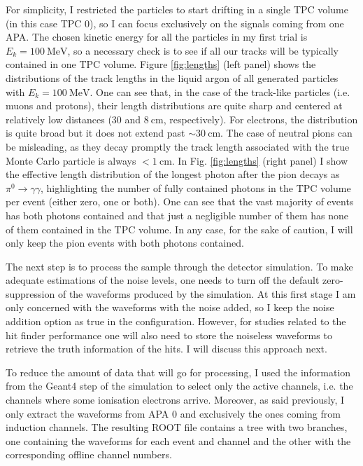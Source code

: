 For simplicity, I restricted the particles to start drifting in a single TPC volume (in this case TPC 0), so I can focus exclusively on the signals coming from one APA. The chosen kinetic energy for all the particles in my first trial is $E_{k} = 100 \ \mathrm{MeV}$, so a necessary check is to see if all our tracks will be typically contained in one TPC volume. Figure \ref{fig:lengths} (left panel) shows the distributions of the track lengths in the liquid argon of all generated particles with $E_{k} = 100 \ \mathrm{MeV}$. One can see that, in the case of the track-like particles (i.e. muons and protons), their length distributions are quite sharp and centered at relatively low distances ($30$ and $8 \ \mathrm{cm}$, respectively). For electrons, the distribution is quite broad but it does not extend past $\sim 30 \ \mathrm{cm}$. The case of neutral pions can be misleading, as they decay promptly the track length associated with the true Monte Carlo particle is always $< 1 \ \mathrm{cm}$. In Fig. \ref{fig:lengths} (right panel) I show the effective length distribution of the longest photon after the pion decays as $\pi^{0} \rightarrow \gamma \gamma$, highlighting the number of fully contained photons in the TPC volume per event (either zero, one or both). One can see that the vast majority of events has both photons contained and that just a negligible number of them has none of them contained in the TPC volume. In any case, for the sake of caution, I will only keep the pion events with both photons contained.

The next step is to process the sample through the detector simulation. To make adequate estimations of the noise levels, one needs to turn off the default zero-suppression of the waveforms produced by the simulation. At this first stage I am only concerned with the waveforms with the noise added, so I keep the noise addition option as true in the configuration. However, for studies related to the hit finder performance one will also need to store the noiseless waveforms to retrieve the truth information of the hits. I will discuss this approach next.

To reduce the amount of data that will go for processing, I used the information from the Geant4 step of the simulation to select only the active channels, i.e. the channels where some ionisation electrons arrive. Moreover, as said previously, I only extract the waveforms from APA $0$ and exclusively the ones coming from induction channels. The resulting ROOT file contains a tree with two branches, one containing the waveforms for each event and channel and the other with the corresponding offline channel numbers.

